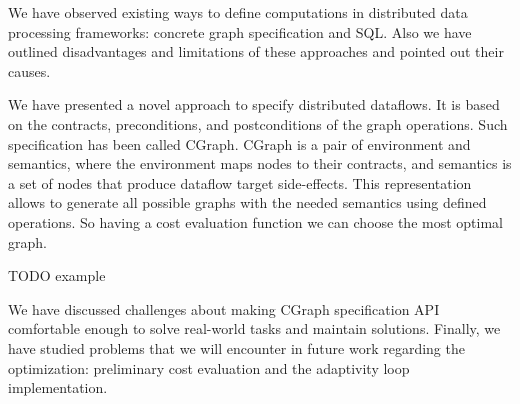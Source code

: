 We have observed existing ways to define computations in distributed data processing frameworks: concrete graph specification and SQL.
Also we have outlined disadvantages and limitations of these approaches and pointed out their causes.

We have presented a novel approach to specify distributed dataflows.
It is based on the contracts, preconditions, and postconditions of the graph operations.
Such specification has been called CGraph.
CGraph is a pair of environment and semantics, where the environment maps nodes to their contracts, and semantics is a set of nodes that produce dataflow target side-effects.
This representation allows to generate all possible graphs with the needed semantics using defined operations.
So having a cost evaluation function we can choose the most optimal graph.

TODO example

We have discussed challenges about making CGraph specification API comfortable enough to solve real-world tasks and maintain solutions.
Finally, we have studied problems that we will encounter in future work regarding the optimization: preliminary cost evaluation and the adaptivity loop implementation.
